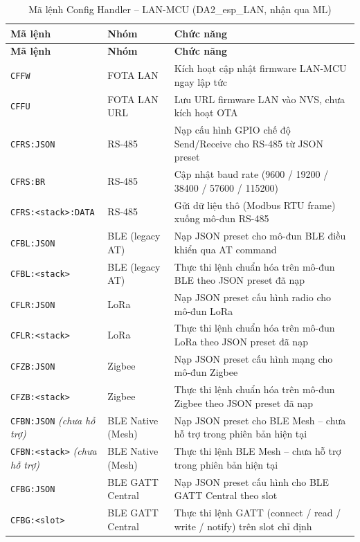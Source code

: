             \begin{longtable}{|p{4cm}|p{2.5cm}|p{8cm}|}
                \caption{Mã lệnh Config Handler -- LAN-MCU (DA2\_esp\_LAN, nhận qua ML)}
                \label{tab:config_lan} \\
                \hline
                \textbf{Mã lệnh} & \textbf{Nhóm} & \textbf{Chức năng} \\ \hline
                \endfirsthead
                \hline
                \textbf{Mã lệnh} & \textbf{Nhóm} & \textbf{Chức năng} \\ \hline
                \endhead
                \texttt{CFFW} & FOTA LAN & Kích hoạt cập nhật firmware LAN-MCU ngay lập tức \\ \hline
                \texttt{CFFU} & FOTA LAN URL & Lưu URL firmware LAN vào NVS, chưa kích hoạt OTA \\ \hline
                \texttt{CFRS:JSON} & RS-485 & Nạp cấu hình GPIO chế độ Send/Receive cho RS-485 từ JSON preset \\ \hline
                \texttt{CFRS:BR} & RS-485 & Cập nhật baud rate (9600 / 19200 / 38400 / 57600 / 115200) \\ \hline
                \texttt{CFRS:<stack>:DATA} & RS-485 & Gửi dữ liệu thô (Modbus RTU frame) xuống mô-đun RS-485 \\ \hline
                \texttt{CFBL:JSON} & BLE (legacy AT) & Nạp JSON preset cho mô-đun BLE điều khiển qua AT command \\ \hline
                \texttt{CFBL:<stack>} & BLE (legacy AT) & Thực thi lệnh chuẩn hóa trên mô-đun BLE theo JSON preset đã nạp \\ \hline
                \texttt{CFLR:JSON} & LoRa & Nạp JSON preset cấu hình radio cho mô-đun LoRa \\ \hline
                \texttt{CFLR:<stack>} & LoRa & Thực thi lệnh chuẩn hóa trên mô-đun LoRa theo JSON preset đã nạp \\ \hline
                \texttt{CFZB:JSON} & Zigbee & Nạp JSON preset cấu hình mạng cho mô-đun Zigbee \\ \hline
                \texttt{CFZB:<stack>} & Zigbee & Thực thi lệnh chuẩn hóa trên mô-đun Zigbee theo JSON preset đã nạp \\ \hline
                \texttt{CFBN:JSON} \textit{(chưa hỗ trợ)} & BLE Native (Mesh) & Nạp JSON preset cho BLE Mesh -- chưa hỗ trợ trong phiên bản hiện tại \\ \hline
                \texttt{CFBN:<stack>} \textit{(chưa hỗ trợ)} & BLE Native (Mesh) & Thực thi lệnh BLE Mesh -- chưa hỗ trợ trong phiên bản hiện tại \\ \hline
                \texttt{CFBG:JSON} & BLE GATT Central & Nạp JSON preset cấu hình cho BLE GATT Central theo slot \\ \hline
                \texttt{CFBG:<slot>} & BLE GATT Central & Thực thi lệnh GATT (connect / read / write / notify) trên slot chỉ định \\ \hline
            \end{longtable}
        
